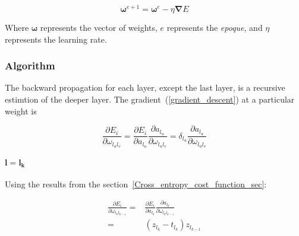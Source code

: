 \documentclass[final, paper=letter,5p,times,twocolumn]{elsarticle}
\begin{document}
\begin{equation}
  \bm{\omega}^{e+1} = \bm{\omega}^{e} - \eta \bm{\nabla} E
  \label{gradient_descent}
\end{equation}

Where $\bm{\omega}$ represents the vector of weights, $e$ represents the {\it epoque}, and $\eta$ represents the learning rate. 


\subsubsection{Algorithm}

The backward propagation for each layer, except the last layer, is a recursive estimtion of the deeper layer. The gradient~(\ref{gradient_descent}) at a particular weight is

\begin{equation*}
  \frac{\partial E_{i}}{\partial \omega_{l_{u}l_{v}}} = \frac{\partial E_{i}}{\partial a_{l_{u}}} \frac{\partial a_{l_{u}}}{\partial \omega_{l_{u}l_{v}}} = \delta_{l_{u}}\frac{\partial a_{l_{u}}}{\partial \omega_{l_{u}l_{v}}} 
\end{equation*}


\paragraph{$\bm{l = l_{k}}$}{ Using the results from the section~\ref{Cross_entropy_cost_function_sec}:

  \begin{equation*}
    \begin{split}
      \frac{\partial E_{i}}{\partial \omega_{l_{k}l_{k-1}}} = &  \frac{\partial E_{i}}{\partial a_{l_{k}}} \frac{\partial a_{l_{k}}}{\partial \omega_{l_{k}l_{k-1}}}  \\
              = &  (z_{l_{k}} - t_{l_{k}})z_{l_{k-1}} \\
    \end{split}
  \end{equation*}

}
\end{document}
